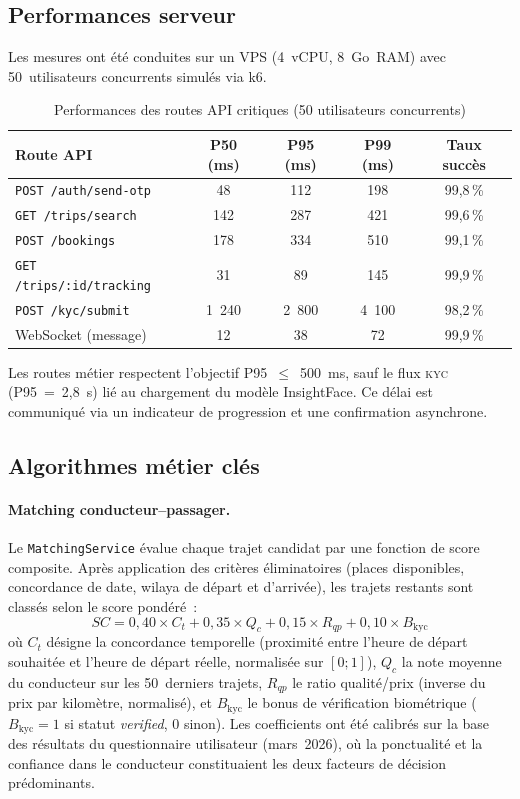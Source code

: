 \subsection{Performances serveur}
\label{sec:performances-serveur}

Les mesures ont été conduites sur un VPS (4~vCPU, 8~Go~RAM) avec 50~utilisateurs concurrents simulés via k6.

\begin{table}[H]
\centering
\footnotesize
\begin{tabularx}{\textwidth}{|X|c|c|c|c|}
\hline
\rowcolor{rohlight}
\textbf{Route API} & \textbf{P50 (ms)} & \textbf{P95 (ms)} & \textbf{P99 (ms)} & \textbf{Taux succès} \\
\hline
\texttt{POST /auth/send-otp} & 48 & 112 & 198 & 99,8\,\% \\
\hline
\texttt{GET /trips/search} & 142 & 287 & 421 & 99,6\,\% \\
\hline
\texttt{POST /bookings} & 178 & 334 & 510 & 99,1\,\% \\
\hline
\texttt{GET /trips/:id/tracking} & 31 & 89 & 145 & 99,9\,\% \\
\hline
\texttt{POST /kyc/submit} & 1~240 & 2~800 & 4~100 & 98,2\,\% \\
\hline
WebSocket (message) & 12 & 38 & 72 & 99,9\,\% \\
\hline
\end{tabularx}
  \caption{Performances des routes API critiques (50 utilisateurs concurrents)}
  \label{tab:perf}
\end{table}

Les routes métier respectent l'objectif P95~$\leq$~500~ms, sauf le flux \textsc{kyc} (P95~=~2,8~s) lié au chargement du modèle InsightFace. Ce délai est communiqué via un indicateur de progression et une confirmation asynchrone.

\subsection{Algorithmes métier clés}

\paragraph{Matching conducteur--passager.} Le \texttt{MatchingService} évalue chaque trajet candidat par une fonction de score composite. Après application des critères éliminatoires (places disponibles, concordance de date, wilaya de départ et d'arrivée), les trajets restants sont classés selon le score pondéré~:
$$SC = 0{,}40 \times C_t + 0{,}35 \times Q_c + 0{,}15 \times R_{qp} + 0{,}10 \times B_{\text{kyc}}$$
où $C_t$ désigne la concordance temporelle (proximité entre l'heure de départ souhaitée et l'heure de départ réelle, normalisée sur $[0; 1]$), $Q_c$ la note moyenne du conducteur sur les 50~derniers trajets, $R_{qp}$ le ratio qualité/prix (inverse du prix par kilomètre, normalisé), et $B_{\text{kyc}}$ le bonus de vérification biométrique ($B_{\text{kyc}} = 1$ si statut \textit{verified}, $0$ sinon). Les coefficients ont été calibrés sur la base des résultats du questionnaire utilisateur (mars~2026), où la ponctualité et la confiance dans le conducteur constituaient les deux facteurs de décision prédominants.

